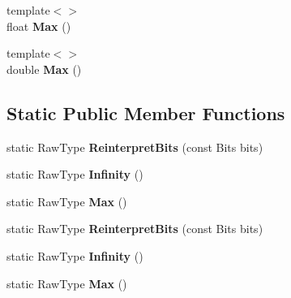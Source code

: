 \begin{DoxyCompactItemize}
\item 
\hypertarget{classtesting_1_1internal_1_1_floating_point_af2eda9331e679229a1baa3404b57b51d}{}{\footnotesize template$<$$>$ }\\float {\bfseries Max} ()\label{classtesting_1_1internal_1_1_floating_point_af2eda9331e679229a1baa3404b57b51d}

\item 
\hypertarget{classtesting_1_1internal_1_1_floating_point_afc2e85c0e886cb13b2300e961c9a9648}{}{\footnotesize template$<$$>$ }\\double {\bfseries Max} ()\label{classtesting_1_1internal_1_1_floating_point_afc2e85c0e886cb13b2300e961c9a9648}

\end{DoxyCompactItemize}
\subsection*{Static Public Member Functions}
\begin{DoxyCompactItemize}
\item 
\hypertarget{classtesting_1_1internal_1_1_floating_point_ac551f793522e54fbd8a25acb79eac5b1}{}static Raw\+Type {\bfseries Reinterpret\+Bits} (const Bits bits)\label{classtesting_1_1internal_1_1_floating_point_ac551f793522e54fbd8a25acb79eac5b1}

\item 
\hypertarget{classtesting_1_1internal_1_1_floating_point_a460027cc19cf01ae8e09cc3796b2b575}{}static Raw\+Type {\bfseries Infinity} ()\label{classtesting_1_1internal_1_1_floating_point_a460027cc19cf01ae8e09cc3796b2b575}

\item 
\hypertarget{classtesting_1_1internal_1_1_floating_point_aae5954d8a57d3ff0987c6930cb68e114}{}static Raw\+Type {\bfseries Max} ()\label{classtesting_1_1internal_1_1_floating_point_aae5954d8a57d3ff0987c6930cb68e114}

\item 
\hypertarget{classtesting_1_1internal_1_1_floating_point_ac551f793522e54fbd8a25acb79eac5b1}{}static Raw\+Type {\bfseries Reinterpret\+Bits} (const Bits bits)\label{classtesting_1_1internal_1_1_floating_point_ac551f793522e54fbd8a25acb79eac5b1}

\item 
\hypertarget{classtesting_1_1internal_1_1_floating_point_a460027cc19cf01ae8e09cc3796b2b575}{}static Raw\+Type {\bfseries Infinity} ()\label{classtesting_1_1internal_1_1_floating_point_a460027cc19cf01ae8e09cc3796b2b575}

\item 
\hypertarget{classtesting_1_1internal_1_1_floating_point_aae5954d8a57d3ff0987c6930cb68e114}{}static Raw\+Type {\bfseries Max} ()\label{classtesting_1_1internal_1_1_floating_point_aae5954d8a57d3ff0987c6930cb68e114}

\end{DoxyCompactItemize}
